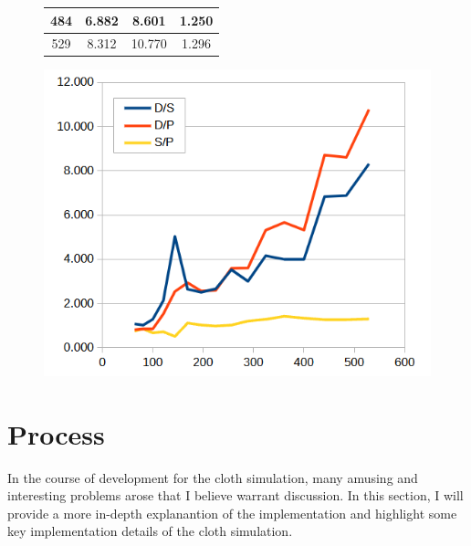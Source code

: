 \documentclass[letterpaper, 10 pt, conference]{ieeeconf}  %
\begin{document}
\begin{figure}
\begin{minipage}[b]{.45\linewidth}
\begin{center}
\begin{tabular}{|c|c|c|c|}
                                484               & 6.882          & 8.601           & 1.250            \\ \hline
                                529               & 8.312          & 10.770          & 1.296            \\ \hline
                                \end{tabular}
                \end{center}
                \label{fig:speedups}
        \end{minipage}\hfill
        \begin{minipage}[b]{.45\linewidth}
                \centering
                \includegraphics[width=1.1\linewidth]{speedups.png}
        \end{minipage}
\end{figure}

\twocolumn

\section{Process}
 In the course of development for the cloth simulation, many amusing and interesting problems arose that I believe warrant discussion. In this section, I will provide a more in-depth explanantion of the implementation and highlight some key implementation details of the cloth simulation.
\end{document}
